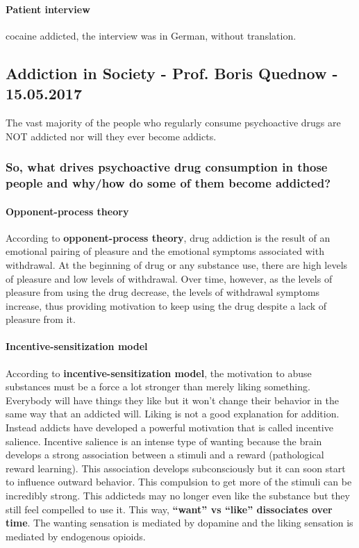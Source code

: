 \documentclass[12pt,article,oneside,a4paper]{memoir}
\begin{document}
\paragraph{Patient interview} cocaine addicted, the interview was in German, without translation.

\subsection{Addiction in Society - Prof. Boris Quednow - 15.05.2017}

The vast majority of the people who regularly consume psychoactive drugs are NOT addicted nor will they ever become addicts.

\subsubsection{So, what drives psychoactive drug consumption in those people and why/how do some of them become addicted?}

\paragraph{Opponent-process theory}
According to \textbf{opponent-process theory}, drug addiction is the result of an emotional pairing of pleasure and the emotional symptoms associated with withdrawal.
At the beginning of drug or any substance use, there are high levels of pleasure and low levels of withdrawal. Over time, however, as the levels of pleasure from using the drug decrease, the levels of withdrawal symptoms increase, thus providing motivation to keep using the drug despite a lack of pleasure from it.

\paragraph{Incentive-sensitization model}
According to \textbf{incentive-sensitization model}, the motivation to abuse substances must be a force a lot stronger than merely liking something. Everybody will have things they like but it won’t change their behavior in the same way that an addicted will. Liking is not a good explanation for addition. Instead addicts have developed a powerful motivation that is called incentive salience.
Incentive salience is an intense type of wanting because the brain develops a strong association between a stimuli and a reward (pathological reward learning). This association develops subconsciously but it can soon start to influence outward behavior. This compulsion to get more of the stimuli can be incredibly strong. This addicteds may no longer even like the substance but they still feel compelled to use it.
This way, \textbf{``want'' vs ``like'' dissociates over time}. The wanting sensation is mediated by dopamine and the liking sensation is mediated by endogenous opioids.
\end{document}
